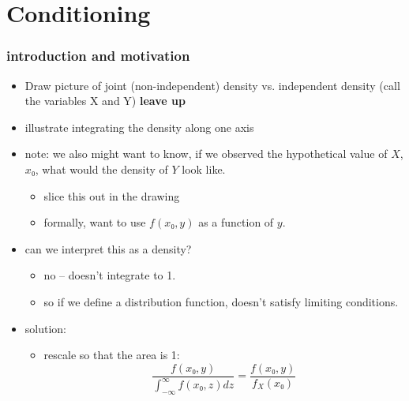 

\part*{Conditioning}%

\section{introduction and motivation}

\begin{itemize}
\item Draw picture of joint (non-independent) density vs. independent
      density (call the variables X and Y) \textbf{leave up}
\item illustrate integrating the density along one axis
\item note: we also might want to know, if we observed the hypothetical
      value of $X$, $x₀$, what would the density of $Y$ look like.
\begin{itemize}
\item slice this out in the drawing
\item formally, want to use $f(x₀, y)$ as a function of $y$.
\end{itemize}
\item can we interpret this as a density?
\begin{itemize}
\item no -- doesn't integrate to 1.
\item so if we define a distribution function, doesn't satisfy
        limiting conditions.
\end{itemize}
\item solution:
\begin{itemize}
\item rescale so that the area is 1:
  \[ \frac{f(x₀, y)}{∫_{-∞}^∞ f(x₀, z) dz} = \frac{f(x₀, y)}{f_X(x₀)}\]
\end{itemize}
\end{itemize}

